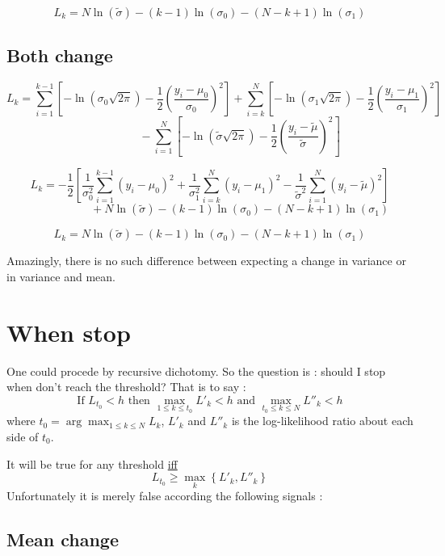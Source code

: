 \documentclass[11pt]{article}
\begin{document}
\[L_k=N\ln(\tilde\sigma)-(k-1)\ln(\sigma_0)-(N-k+1)\ln(\sigma_1)\]

\subsection{Both change}

\[L_k=
\sum_{i=1}^{k-1}\left[-\ln(\sigma_0\sqrt{2\pi})-\frac 12\left(\frac{y_i-\mu_0}{\sigma_0}\right)^2\right]
+\sum_{i=k}^N\left[-\ln(\sigma_1\sqrt{2\pi})-\frac 12\left(\frac{y_i-\mu_1}{\sigma_1}\right)^2\right]\]
\[~~~~~~~~~~~~~~~~~~~~~~~~-\sum_{i=1}^N\left[-\ln(\tilde\sigma\sqrt{2\pi})-\frac 12\left(\frac{y_i-\tilde\mu}{\tilde\sigma}\right)^2\right]\]

\[L_k=
-\frac 12\left[\frac 1{\sigma_0^2}\sum_{i=1}^{k-1}(y_i-\mu_0)^2
+\frac 1{\sigma_1^2}\sum_{i=k}^N(y_i-\mu_1)^2
-\frac 1{\tilde\sigma^2}\sum_{i=1}^N(y_i-\tilde\mu)^2\right]\]
\[~~~~~~~~~~~~~~~~~~~~~~~~+N\ln(\tilde\sigma)-(k-1)\ln(\sigma_0)-(N-k+1)\ln(\sigma_1)\]

\[L_k=N\ln(\tilde\sigma)-(k-1)\ln(\sigma_0)-(N-k+1)\ln(\sigma_1)\]

Amazingly, there is no such difference between expecting a change in variance or in variance and mean.

\section{When stop}

One could procede by recursive dichotomy. So the question is : should I stop when don't reach the threshold? That is to say :
\[\text{If }L_{t_0}< h\text{ then }\max_{1\le k\le t_0}L'_k< h\text{ and }\max_{t_0\le k\le N}L''_k< h\]
where $t_0=\arg\max_{1\le k\le N}L_k$, $L'_k$ and $L''_k$ is the log-likelihood ratio about each side of $t_0$.

It will be true for any threshold \underline{iff}
\[L_{t_0}\ge\max_k\left\{L'_k,L''_k\right\}\]
Unfortunately it is merely false according the following signals :

\subsection{Mean change}
\end{document}
